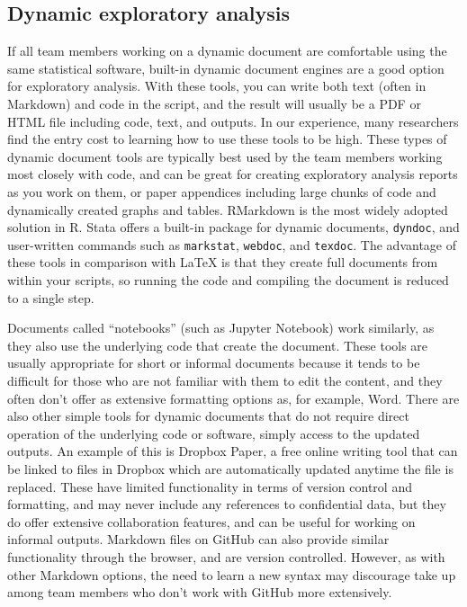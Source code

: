 \subsection{Dynamic exploratory analysis}

If all team members working on a dynamic document are comfortable using the same statistical software,
built-in dynamic document engines are a good option for exploratory analysis.
With these tools,
you can write both text (often in Markdown) and code in the script,
and the result will usually be a PDF or HTML file including code, text, and outputs.
In our experience, many researchers find the entry cost to learning how to use these tools to be high.
These types of dynamic document tools are typically best used by the team members working most closely with code,
and can be great for creating exploratory analysis reports as you work on them,
or paper appendices including large chunks of code and dynamically created graphs and tables.
RMarkdown is the most widely adopted solution in R.
Stata offers a built-in package for dynamic documents, \texttt{dyndoc},
and user-written commands such as \texttt{markstat},
\texttt{webdoc}, and
\texttt{texdoc}.
The advantage of these tools in comparison with LaTeX is that
they create full documents from within your scripts,
so running the code and compiling the document is reduced to a single step.

Documents called ``notebooks'' 
(such as Jupyter Notebook) 
work similarly,
as they also use the underlying code that create the document.
These tools are usually appropriate for short or informal documents
because it tends to be difficult for those who are not familiar with them to edit the content,
and they often don't offer as extensive formatting options as, for example, Word.
There are also other simple tools for dynamic documents
that do not require direct operation of the underlying code or software,
simply access to the updated outputs.
An example of this is Dropbox Paper,
a free online writing tool that can be linked to files in Dropbox
which are automatically updated anytime the file is replaced.
These have limited functionality in terms of version control and formatting,
and may never include any references to confidential data,
but they do offer extensive collaboration features,
and can be useful for working on informal outputs.
Markdown files on GitHub can also provide similar functionality through the browser,
and are version controlled.
However, as with other Markdown options, the need to learn a new syntax may
discourage take up among team members who don't work with GitHub more extensively.

